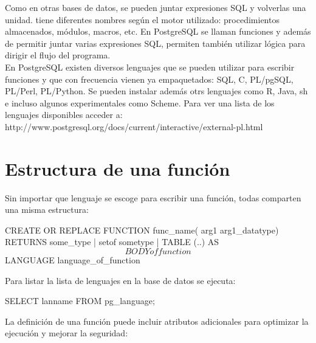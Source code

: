 Como en otras bases de datos, se pueden juntar expresiones SQL y volverlas una unidad. tiene diferentes nombres según el motor utilizado: procedimientos almacenados, módulos, macros, etc. En PostgreSQL se llaman funciones y además de permitir juntar varias expresiones SQL, permiten también utilizar lógica para dirigir el flujo del programa.\\

En PostgreSQL existen diversos lenguajes que se pueden utilizar para escribir funciones y que con frecuencia vienen ya empaquetados: SQL, C, PL/pgSQL, PL/Perl, PL/Python. Se pueden instalar además otrs lenguajes como R, Java, sh e incluso algunos experimentales como Scheme. Para ver una lista de los lenguajes disponibles acceder a:\\

http://www.postgresql.org/docs/current/interactive/external-pl.html\\

\section{Estructura de una función }

Sin importar que lenguaje se escoge para escribir una función, todas comparten una misma estructura:\\

\begin{pyglist}
CREATE OR REPLACE FUNCTION func_name(
     arg1 arg1_datatype)
RETURNS some_type | setof sometype | TABLE (..) AS
$$
BODY of function
$$
LANGUAGE language_of_function
\end{pyglist}

Para listar la lista de lenguajes en la base de datos se ejecuta:\\

\begin{pyglist}
SELECT lanname FROM pg_language;
\end{pyglist}

La definición de una función puede incluir atributos adicionales para optimizar la ejecución y mejorar la seguridad:\\

